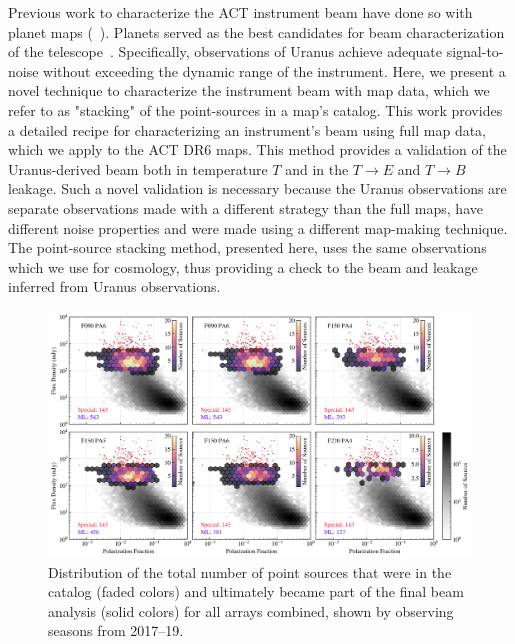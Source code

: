 Previous work to characterize the ACT instrument beam have done so with planet maps (~\cite{hasselfield_atacama_2013,louis_2017,naess_2014}).  Planets served as the best candidates for beam characterization of the telescope~\cite{Lungu_2022}.  Specifically, observations of Uranus achieve adequate signal-to-noise without exceeding the dynamic range of the instrument.  Here, we present a novel technique to characterize the instrument beam with map data, which we refer to as "stacking" of the point-sources in a map's catalog.  This work provides a detailed recipe for characterizing an instrument's beam using full map data, which we apply to the ACT DR6 maps.  This method provides a validation of the Uranus-derived beam both in temperature $T$ and in the $T\rightarrow E$ and $T\rightarrow B$ leakage.  Such a novel validation is necessary because the Uranus observations are separate observations made with a different strategy than the full maps, have different noise properties and were made using a different map-making technique.  The point-source stacking method, presented here, uses the same observations which we use for cosmology, thus providing a check to the beam and leakage inferred from Uranus observations.

\begin{figure}[t]
\vspace{1em}
    \centering
    \includegraphics[width=\linewidth]{Figures/pt_src_dist.png}
    \caption{Distribution of the total number of point sources that were in the catalog (faded colors) and ultimately became part of the final beam analysis (solid colors) for all arrays combined, shown by observing seasons from 2017--19.
    }
    \label{fig:ptsrc_select}
    \vspace{1em}
\end{figure}

